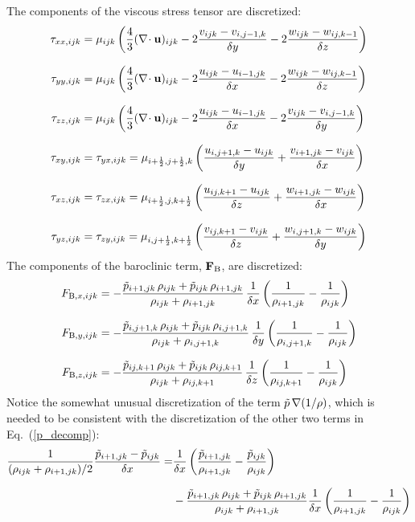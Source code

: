 The components of the viscous stress tensor are discretized:
\begin{align}
\tau_{xx,ijk} &= \mu_{ijk} \left( \frac{4}{3} (\nabla\!\cdot {\mathbf{u}})_{ijk} - 2 \frac{v_{ijk}-v_{i,j-1,k}}{\delta y} - 2 \frac{w_{ijk}-w_{ij,k-1}}{\delta z} \right)  \\[.1in]
\tau_{yy,ijk} &= \mu_{ijk} \left( \frac{4}{3} (\nabla\!\cdot {\mathbf{u}})_{ijk} - 2 \frac{u_{ijk}-u_{i-1,jk}}{\delta x}  - 2 \frac{w_{ijk}-w_{ij,k-1}}{\delta z} \right)  \\[.1in]
\tau_{zz,ijk} &= \mu_{ijk} \left( \frac{4}{3} (\nabla\!\cdot {\mathbf{u}})_{ijk} - 2 \frac{u_{ijk}-u_{i-1,jk}}{\delta x}  - 2 \frac{v_{ijk}-v_{i,j-1,k}}{\delta y} \right)  \\[.1in]
\tau_{xy,ijk} &= \tau_{yx,ijk} = \mu_{i+\frac{1}{2},j+\frac{1}{2},k} \left( \frac{u_{i,j+1,k}-u_{ijk}}{\delta y} + \frac{v_{i+1,jk} -v_{ijk}}{\delta x} \right) \\[.1in]
\tau_{xz,ijk} &= \tau_{zx,ijk} = \mu_{i+\frac{1}{2},j,k+\frac{1}{2}} \left( \frac{u_{ij,k+1}-u_{ijk}}{\delta z}  + \frac{w_{i+1,jk}-w_{ijk}}{\delta x} \right) \\[.1in]
\tau_{yz,ijk} &= \tau_{zy,ijk} = \mu_{i,j+\frac{1}{2},k+\frac{1}{2}} \left( \frac{v_{ij,k+1}-v_{ijk}}{\delta z}  + \frac{w_{i,j+1,k}-w_{ijk}}{\delta y} \right)
\end{align}
The components of the baroclinic term, ${\mathbf{F}}_{\rm B}$, are discretized:
\begin{align}
F_{{\rm B},x,ijk} &=  - \frac{\tilde{p}_{i+1,jk}  \, \rho_{ijk} + \tilde{p}_{ijk} \, \rho_{i+1,jk}}{\rho_{ijk}+\rho_{i+1,jk}}   \, \frac{1}{\delta x} \left( \frac{1}{\rho_{i+1,jk}}  - \frac{1}{\rho_{ijk}} \right) \\[.1in]
F_{{\rm B},y,ijk} &=  - \frac{\tilde{p}_{i,j+1,k} \, \rho_{ijk} + \tilde{p}_{ijk} \, \rho_{i,j+1,k}}{\rho_{ijk}+\rho_{i,j+1,k}} \, \frac{1}{\delta y} \left( \frac{1}{\rho_{i,j+1,k}} - \frac{1}{\rho_{ijk}} \right) \\[.1in]
F_{{\rm B},z,ijk} &=  - \frac{\tilde{p}_{ij,k+1}  \, \rho_{ijk} + \tilde{p}_{ijk} \, \rho_{ij,k+1}}{\rho_{ijk}+\rho_{ij,k+1}}   \, \frac{1}{\delta z} \left( \frac{1}{\rho_{ij,k+1}}  - \frac{1}{\rho_{ijk}} \right)
\end{align}
Notice the somewhat unusual discretization of the term $\tilde{p} \, \nabla (1/\rho)$, which is needed to be consistent with the discretization of the other two terms in Eq.~(\ref{p_decomp}):
\begin{align}
  \frac{1}{(\rho_{ijk}+\rho_{i+1,jk})/2} \frac{\tilde{p}_{i+1,jk}-\tilde{p}_{ijk}}{\delta x} =& \frac{1}{\delta x} \left( \frac{\tilde{p}_{i+1,jk}}{\rho_{i+1,jk}}-\frac{\tilde{p}_{ijk}}{\rho_{ijk}} \right) \nonumber \\[.1in]
  & - \frac{\tilde{p}_{i+1,jk} \, \rho_{ijk} + \tilde{p}_{ijk} \, \rho_{i+1,jk}}{\rho_{ijk}+\rho_{i+1,jk}} \frac{1}{\delta x} \left( \frac{1}{\rho_{i+1,jk}} - \frac{1}{\rho_{ijk}} \right)
\end{align}



